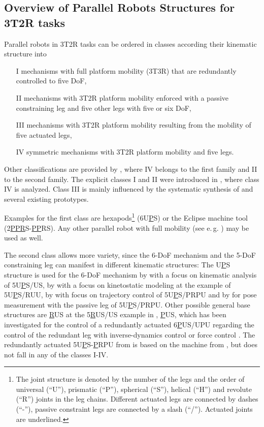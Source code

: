 \documentclass[robotics,article,submit,moreauthors,pdftex]{Definitions/mdpi}
\begin{document}
\subsection{Overview of Parallel Robots Structures for 3T2R tasks}

Parallel robots in 3T2R tasks can be ordered in classes according their kinematic structure into
\begin{itemize}
	\item[I] mechanisms with full platform mobility (3T3R) that are redundantly controlled to five DoF,
	\item[II] mechanisms with 3T2R platform mobility enforced with a passive constraining leg and five other legs with five or six DoF,
	\item[III] mechanisms with 3T2R platform mobility resulting from the mobility of five actuated legs,
	\item[IV] symmetric mechanisms with 3T2R platform mobility and five legs.
\end{itemize}

Other classifications are provided by \cite{HuangLiuChe2011}, where IV belongs to the first family and II to the second family.
The explicit classes I and II were introduced in \cite{Tale-MasoulehGos2011}, where class IV is analyzed.
Class III is mainly influenced by the systematic synthesis of \cite{Gogu2008} and several existing prototypes.

Examples for the first class are hexapods\footnote{The joint structure is denoted by the number of the legs and the order of universal (``U''), prismatic (``P''), spherical (``S''), helical (``H'') and revolute (``R'') joints in the leg chains. Different actuated legs are connected by dashes (``-''), passive constraint legs are connected by a slash (``/''). Actuated joints are underlined.} (6U\underline{P}S) \cite{MerletPerDan2000} or the Eclipse \cite{HongKim2000} machine tool (2\underline{PPR}S-\underline{PP}RS).
Any other parallel robot with full mobility (see e.\,g. \cite{Merlet2006,Gogu2008,Zhang2009}) may be used as well.

The second class allows more variety, since the 6-DoF mechanism and the 5-DoF constraining leg can manifest in different kinematic structures:
The U\underline{P}S structure is used for the 6-DoF mechanism by \cite{WangGos1997} with a focus on kinematic analysis of 5U\underline{P}S/US, by \cite{ZhangGos2001}  with a focus on kinetostatic modeling at the example of 5U\underline{P}S/RUU, by \cite{ZhengGaoZha2005} with focus on trajectory control of 5U\underline{P}S/PRPU and by \cite{GaoSunZha2004} for pose measurement with the passive leg of 5U\underline{P}S/PRPU.
Other possible general base structures are \underline{R}US at the 5\underline{R}US/US example in \cite{WangGos1997}, \underline{P}US, which has been investigated for the control of a redundantly actuated 6\underline{P}US/UPU regarding the control of the redundant leg with inverse-dynamics control \cite{LiuXuYaoXu2015} or force control \cite{WenQinZhaLam2016}.
The redundantly actuated 5U\underline{P}S-\underline{P}RPU from \cite{ChengWanZha2008} is based on the machine from \cite{ZhengGaoZha2005}, but does not fall in any of the classes I-IV.
\end{document}
